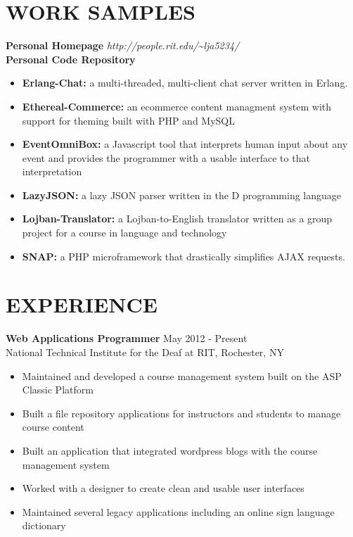 \documentclass[line,margin]{res}
\begin{document}
\begin{resume}
 
\section{WORK SAMPLES} 
\vspace{-2ex}
\begin{tabbing}
{\bf Personal Homepage} \hspace{.5in}   \= {\sl http://people.rit.edu/\textasciitilde{}lja5234/} \\
{\bf Personal Code Repository}	
\end{tabbing}
  \begin{itemize}  \itemsep -2pt %
\item {\bf Erlang-Chat:} a multi-threaded, multi-client chat server written in Erlang.
\item {\bf Ethereal-Commerce:} an ecommerce content managment system with support for theming built with PHP and MySQL
\item {\bf EventOmniBox:} a Javascript tool that interprets human input about any event and provides the programmer with a usable interface to that interpretation
\item {\bf LazyJSON:} a lazy JSON parser written in the D programming language
\item {\bf Lojban-Translator:} a Lojban-to-English translator written as a group project for a course in language and technology 
\item {\bf SNAP:} a PHP microframework that drastically simplifies AJAX requests.
\end{itemize}




 
 
\section{EXPERIENCE} {\bf Web Applications Programmer} \hfill May 2012 - Present \\
               National Technical Institute for the Deaf at RIT, 
               Rochester, NY
               
                 \begin{itemize}  \itemsep -2pt %
                 \item Maintained and developed a course management system built on the ASP Classic Platform
                 \item Built a file repository applications for instructors and students to manage course content
                 \item Built an application that integrated wordpress blogs with the course management system
                 \item Worked with a designer to create clean and usable user interfaces
                 \item Maintained several legacy applications including an online sign language dictionary
                \end{itemize}
 

\end{resume}
\end{document}
